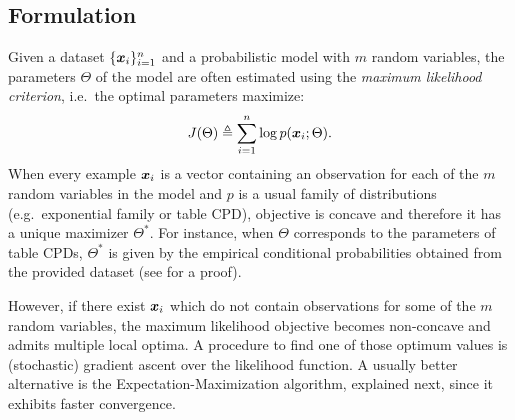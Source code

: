 \subsection{Formulation}
Given a dataset $\lbrace {\bm{x}}_i \rbrace_{i=1}^n$ and a probabilistic model with $m$ random variables, the parameters $\Theta$ of the model are often estimated using the \emph{maximum likelihood criterion}, i.e.\ the optimal parameters maximize:
\begin{equation}
    \label{eq:maximum_likelihood}
    J(\Theta) \triangleq \sum_{i=1}^n \log p({\bm{x}}_i; \Theta).
\end{equation}
When every example ${\bm{x}}_i$ is a vector containing an observation for each of the $m$ random variables in the model and $p$ is a usual family of distributions (e.g.\ exponential family or table CPD), objective  is concave and therefore it has a unique maximizer $\Theta^*$. For instance, when $\Theta$ corresponds to the parameters of table CPDs, $\Theta^*$ is given by the empirical conditional probabilities obtained from the provided dataset (see \citet{Koller2009} for a proof).

However, if there exist ${\bm{x}}_i$ which do not contain observations for some of the $m$ random variables, the maximum likelihood objective becomes non-concave and admits multiple local optima. A procedure to find one of those optimum values is (stochastic) gradient ascent over the likelihood function. A usually better alternative is the Expectation-Maximization algorithm, explained next, since it exhibits faster convergence.

